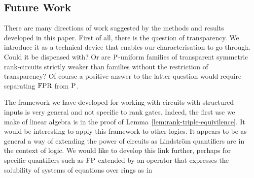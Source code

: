 \documentclass[../paper.tex]{subfiles}
\begin{document}

\subsection*{Future Work}
There are many directions of work suggested by the methods and results
developed in this paper.  First of all, there is the question of
transparency.  We introduce it as a technical device that enables our
characterisation to go through.  Could it be dispensed with?  Or are $\mathrm{P}$-uniform
families of transparent symmetric rank-circuits strictly weaker than
families without the restriction of transparency?  Of course a
positive answer to the latter question would require separating $\text{\upshape FPR}$
from $\mathrm{P}$.

The framework we have developed for  working with circuits with
structured inputs is very general and not specific to rank gates.
Indeed, the first use we make of linear algebra is in the proof of
Lemma~\ref{lem:rank-triple-equivilence}.  It would be interesting to
apply this framework to other logics.  It appears to be as general a way of
extending the power of circuits as Lindstr\"om quantifiers are in the
context of logic.  We would like to develop this link
further, perhaps for specific quantifiers such as $\text{\upshape FP}$ extended by an operator
that expresses the solubility of systems of equations over rings as in~\cite{DGHKP}
\end{document}
